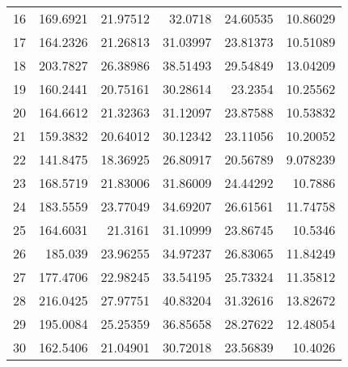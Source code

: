 \begin{anexosenv}
\begin{table}[htbp]
\begin{tabular}{rrrrrr}
    16    & 169.6921 & 21.97512 & 32.0718 & 24.60535 & 10.86029 \\
    17    & 164.2326 & 21.26813 & 31.03997 & 23.81373 & 10.51089 \\
    18    & 203.7827 & 26.38986 & 38.51493 & 29.54849 & 13.04209 \\
    19    & 160.2441 & 20.75161 & 30.28614 & 23.2354 & 10.25562 \\
    20    & 164.6612 & 21.32363 & 31.12097 & 23.87588 & 10.53832 \\
    21    & 159.3832 & 20.64012 & 30.12342 & 23.11056 & 10.20052 \\
    22    & 141.8475 & 18.36925 & 26.80917 & 20.56789 & 9.078239 \\
    23    & 168.5719 & 21.83006 & 31.86009 & 24.44292 & 10.7886 \\
    24    & 183.5559 & 23.77049 & 34.69207 & 26.61561 & 11.74758 \\
    25    & 164.6031 & 21.3161 & 31.10999 & 23.86745 & 10.5346 \\
    26    & 185.039 & 23.96255 & 34.97237 & 26.83065 & 11.84249 \\
    27    & 177.4706 & 22.98245 & 33.54195 & 25.73324 & 11.35812 \\
    28    & 216.0425 & 27.97751 & 40.83204 & 31.32616 & 13.82672 \\
    29    & 195.0084 & 25.25359 & 36.85658 & 28.27622 & 12.48054 \\
    30    & 162.5406 & 21.04901 & 30.72018 & 23.56839 & 10.4026 \\
    \bottomrule
    \bottomrule
    \end{tabular}%
  \label{tab:exemplo}%
\end{table}%

    
\end{anexosenv}